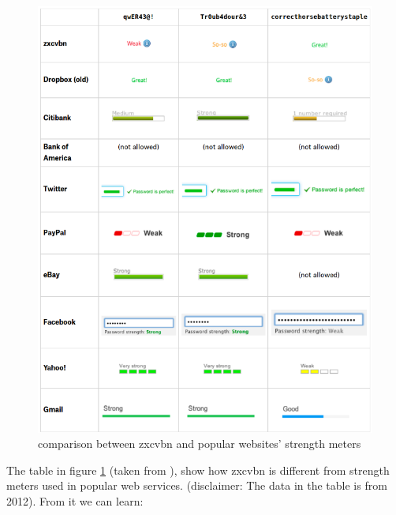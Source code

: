 \begin{figure}[htb]
  \centering
  \captionsetup{justification=centering}
  \includegraphics[width=\columnwidth]{chapters/figures/development/zxcvbn_comp.png}
  \caption{comparison between zxcvbn and popular websites' strength meters}
  \label{fig:tablez}
\end{figure}

The table in figure \ref{fig:tablez} (taken from \cite{zxdropbox}), show how zxcvbn is different from strength meters used in popular web services. (disclaimer: The data in the table is from 2012). From it we can learn:

